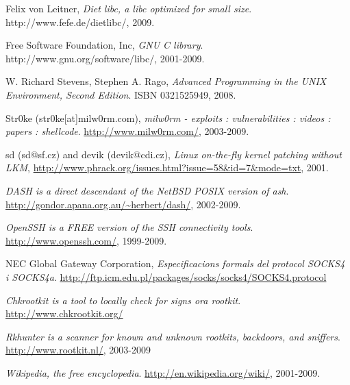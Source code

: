 \clearpage
{}
{}

\begin{thebibliography}{9}
 
  Felix von Leitner,
  \emph{Diet libc, a libc optimized for small size}.
  http://www.fefe.de/dietlibc/,
  2009.
 
  Free Software Foundation, Inc,
  \emph{GNU C library}.
  http://www.gnu.org/software/libc/,
  2001-2009.

  W. Richard Stevens, Stephen A. Rago,
  \emph{Advanced Programming in the UNIX Environment, Second Edition}.
  ISBN 0321525949,
  2008.


  Str0ke (str0ke[at]milw0rm.com),
  \emph{milw0rm - exploits : vulnerabilities : videos : papers : shellcode}.
  \url{http://www.milw0rm.com/},
  2003-2009.

	sd (sd@sf.cz) and devik (devik@cdi.cz),
	\emph{Linux on-the-fly kernel patching without LKM},
	\url{http://www.phrack.org/issues.html?issue=58&id=7&mode=txt},
	2001.

	\emph{DASH is a direct descendant of the NetBSD POSIX version of ash}.
	\url{http://gondor.apana.org.au/~herbert/dash/},
	2002-2009.

	\emph{OpenSSH is a FREE version of the SSH connectivity tools}.
	\url{http://www.openssh.com/},
	1999-2009.

	NEC Global Gateway Corporation,
	\emph{Especificacions formals del protocol SOCKS4 i SOCKS4a}.
	\url{http://ftp.icm.edu.pl/packages/socks/socks4/SOCKS4.protocol}

	\emph{Chkrootkit is a tool to locally check for signs ora rootkit}.
	\url{http://www.chkrootkit.org/}

	\emph{Rkhunter is a scanner for known and unknown rootkits, backdoors, and sniffers}.
	\url{http://www.rootkit.nl/},
	2003-2009

	\emph{Wikipedia, the free encyclopedia}.
	\url{http://en.wikipedia.org/wiki/},
	2001-2009.

\end{thebibliography}
